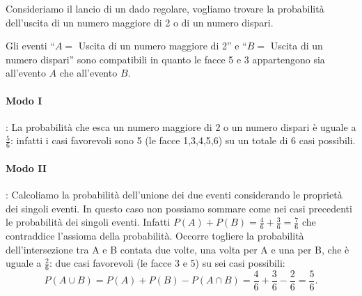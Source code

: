\begin{esempio}
Consideriamo il lancio di un dado regolare, vogliamo trovare la probabilità 
dell'uscita di un numero maggiore di 2 o di un numero dispari.

Gli eventi ``\( A= \) Uscita di un numero maggiore di 2'' e ``\( B= \) Uscita di 
un 
numero dispari'' sono compatibili in quanto le facce 5 e 3 appartengono sia 
all'evento \(A\) che all'evento \(B\).

\paragraph{Modo I}: La probabilità che esca un numero maggiore di \(2\) o un 
numero dispari è uguale a \(\frac 5 6\): infatti i casi favorevoli sono 5 (le 
facce 1,3,4,5,6) su un totale di \(6\) casi possibili.
\paragraph{Modo II}: Calcoliamo la probabilità dell'unione dei due eventi 
considerando le proprietà dei singoli eventi. In questo caso non possiamo 
sommare come nei casi precedenti le probabilità dei singoli eventi. Infatti 
\(P(A)+P(B)=\frac 4 6+\frac 3 6=\frac 7 6\) che contraddice l'assioma della 
probabilità. Occorre togliere la probabilità dell'intersezione tra A e B 
contata 
due volte, una volta per A e una per B, che è uguale a \(\frac 2 6\): due casi 
favorevoli (le facce 3 e 5) su sei casi possibili: \[P(A\cup 
B)=P(A)+P(B)-P(A\cap B)=\frac 4 6+\frac 3 6-\frac 2 6=\frac 5 6.\]
\end{esempio}

